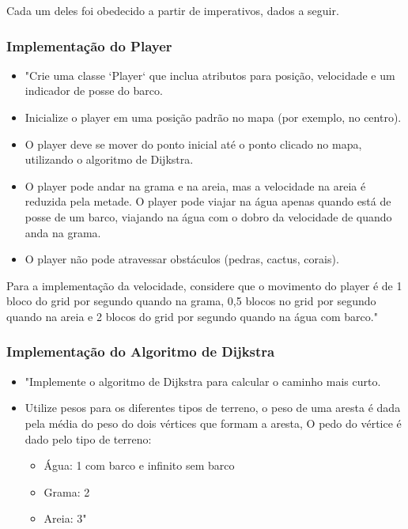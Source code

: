 \documentclass[
	12pt,				%
	oneside,			%
	a4paper,			%
	english,			%
	brazil,				%
	]{abntex2}
\begin{document}
{Cada um deles foi obedecido a partir de imperativos, dados a seguir.

\subsubsection{Implementação do Player}

\begin{itemize}
    \item "Crie uma classe `Player` que inclua atributos para posição, velocidade e um indicador de posse do barco.
    \item Inicialize o player em uma posição padrão no mapa (por exemplo, no centro).
    \item O player deve se mover do ponto inicial até o ponto clicado no mapa, utilizando o algoritmo de Dijkstra.
    \item O player pode andar na grama e na areia, mas a velocidade na areia é reduzida pela metade. O player pode viajar na água apenas quando está de posse de um barco, viajando na água com o dobro da velocidade de quando anda na grama.
    \item O player não pode atravessar obstáculos (pedras, cactus, corais).
\end{itemize}

Para a implementação da velocidade, considere que o movimento do player é de 1 bloco do grid por segundo quando na grama, 0,5 blocos no grid por segundo quando na areia e 2 blocos do grid por segundo quando na água com barco."

\subsubsection{Implementação do Algoritmo de Dijkstra}

\begin{itemize}
    \item "Implemente o algoritmo de Dijkstra para calcular o caminho mais curto.
    \item Utilize pesos para os diferentes tipos de terreno, o peso de uma aresta é dada pela média do peso do dois vértices que formam a aresta, O pedo do vértice é dado pelo tipo de terreno:

\begin{itemize}
    \item Água: 1 com barco e infinito sem barco
    \item Grama: 2
    \item Areia: 3"
\end{itemize}


\end{itemize}}
\end{document}
